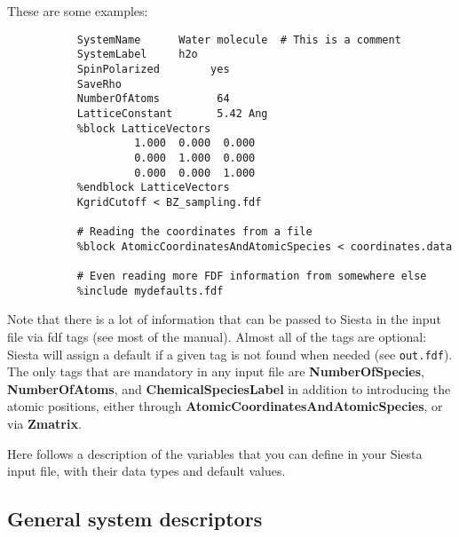 \documentclass[11pt]{article}
\begin{document}
\noindent
These are some examples:

\begin{verbatim}
           SystemName      Water molecule  # This is a comment 
           SystemLabel     h2o
           SpinPolarized        yes 
           SaveRho                 
           NumberOfAtoms         64  
           LatticeConstant       5.42 Ang  
           %block LatticeVectors  
                    1.000  0.000  0.000 
                    0.000  1.000  0.000 
                    0.000  0.000  1.000
           %endblock LatticeVectors  
           KgridCutoff < BZ_sampling.fdf 

           # Reading the coordinates from a file 
           %block AtomicCoordinatesAndAtomicSpecies < coordinates.data 

           # Even reading more FDF information from somewhere else
           %include mydefaults.fdf  
\end{verbatim}

Note that there is a lot of information that can be 
passed to {\sc Siesta} in the input file via fdf tags
(see most of the manual). Almost all of the tags are
optional: {\sc Siesta} will assign a default if a given tag
is not found when needed (see {\tt out.fdf}).
The only tags that are mandatory in any input file are
{\bf NumberOfSpecies}, 
{\bf NumberOfAtoms}, 
and {\bf ChemicalSpeciesLabel} 
in addition to introducing the atomic positions, either through
{\bf AtomicCoordinatesAndAtomicSpecies}, 
or via {\bf Zmatrix}. 

Here follows a description of the variables that you can
define in your {\sc Siesta} input file, with their data types and
default values.

\vspace{5pt}
\subsection{General system descriptors}
\end{document}
